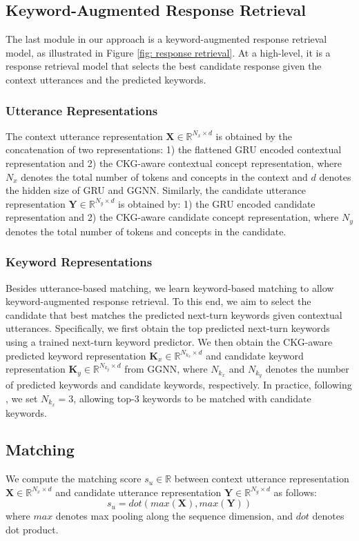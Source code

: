 \documentclass[letterpaper]{article} %
\begin{document}
\subsection{Keyword-Augmented Response Retrieval}
The last module in our approach is a keyword-augmented response retrieval model, as illustrated in Figure \ref{fig: response retrieval}. At a high-level, it is a response retrieval model that selects the best candidate response given the context utterances and the predicted keywords.

\subsubsection{Utterance Representations}
The context utterance representation $\mathbf{X} \in \mathbb{R}^{N_x \times d}$ is obtained by the concatenation of two representations: 1) the flattened GRU encoded contextual representation and 2) the CKG-aware contextual concept representation, where $N_x$ denotes the total number of tokens and concepts in the context and $d$ denotes the hidden size of GRU and GGNN. Similarly, the candidate utterance representation $\mathbf{Y} \in \mathbb{R}^{N_y \times d}$ is obtained by: 1) the GRU encoded candidate representation and 2) the CKG-aware candidate concept representation, where $N_y$ denotes the total number of tokens and concepts in the candidate.

\subsubsection{Keyword Representations}
Besides utterance-based matching, we learn keyword-based matching to allow keyword-augmented response retrieval. To this end, we aim to select the candidate that best matches the predicted next-turn keywords given contextual utterances. Specifically, we first obtain the top predicted next-turn keywords using a trained next-turn keyword predictor. We then obtain the CKG-aware predicted keyword representation $\mathbf{K}_x \in \mathbb{R}^{N_{k_x} \times d}$ and candidate keyword representation $\mathbf{K}_y \in \mathbb{R}^{N_{k_y} \times d}$ from GGNN, where $N_{k_x}$ and $N_{k_y}$ denotes the number of predicted keywords and candidate keywords, respectively. In practice, following \cite{tang2019target}, we set $N_{k_x} = 3$, allowing top-3 keywords to be matched with candidate keywords.

\subsection{Matching}
We compute the matching score $s_u \in \mathbb{R}$ between context utterance representation $\mathbf{X} \in \mathbb{R}^{N_x \times d}$ and candidate utterance representation $\mathbf{Y} \in \mathbb{R}^{N_y \times d}$ as follows:
\begin{equation}
\label{eqn: utterance matching}
s_u = \textit{dot}(\textit{max}(\mathbf{X}), \textit{max}(\mathbf{Y}))
\end{equation}
where $\textit{max}$ denotes max pooling along the sequence dimension, and $\textit{dot}$ denotes dot product.
\end{document}
